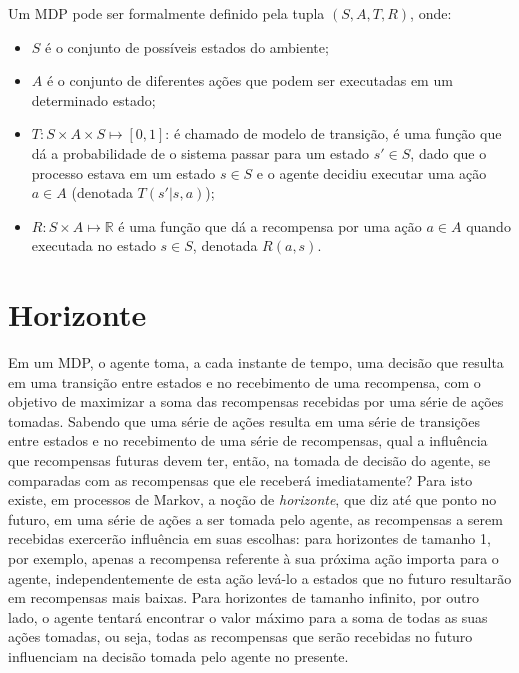 \documentclass[cic,tc]{iiufrgs}
\begin{document}
Um MDP pode ser formalmente definido pela tupla $ (S, A, T, R)$, onde:

\begin{itemize}
  \item $S$ é o conjunto de possíveis estados do ambiente;
  \item $A$ é o conjunto de diferentes ações que podem ser executadas em um
  determinado estado;
  \item $T: S \times A \times S \mapsto [0,1]$: é chamado de modelo de transição,
  é uma função que dá a
  probabilidade de o sistema passar para um estado $s' \in S$, dado que o
  processo estava em um estado $s \in S$ e o agente decidiu executar uma ação
  $a \in A$ (denotada $T(s'|s,a)$);
  \item $R: S \times A \mapsto \mathbb{R}$ é uma função que dá a recompensa
  por uma ação $a \in A$ quando executada no estado $s \in S$, denotada
  $R(a,s)$.
\end{itemize}

\section{Horizonte}
\label{horizonte}
Em um MDP, o agente toma, a cada instante de tempo, uma decisão que resulta em
uma transição entre estados e no recebimento de uma recompensa, com o objetivo
de maximizar a soma das recompensas recebidas por uma série de ações tomadas.
Sabendo que uma série de ações resulta em uma série de transições entre estados
e no recebimento de uma série de recompensas, qual a influência que recompensas
futuras devem ter, então, na tomada de decisão do agente, se comparadas com as
recompensas que ele receberá imediatamente? Para isto existe, em processos de
Markov, a noção de \textit{horizonte}, que diz até que ponto no futuro, em uma
série de ações a ser tomada pelo agente, as recompensas a serem recebidas
exercerão influência em suas escolhas: para horizontes de tamanho 1, por
exemplo, apenas a recompensa referente à sua próxima ação importa para o agente,
independentemente de esta ação levá-lo a estados que no futuro resultarão em
recompensas mais baixas. Para horizontes de tamanho infinito, por outro lado, o
agente tentará encontrar o valor máximo para a soma de todas as suas ações
tomadas, ou seja, todas as recompensas que serão recebidas no futuro influenciam
na decisão tomada pelo agente no presente.
\end{document}
